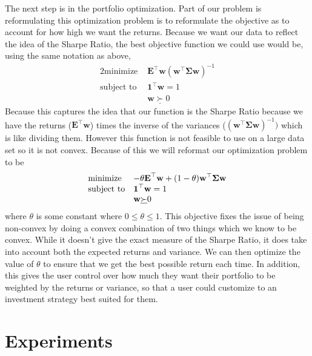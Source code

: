 \documentclass{article}
\begin{document}
The next step is in the portfolio optimization.  Part of our problem is reformulating this optimization problem is to reformulate the objective as to account for how high we want the returns.  Because we want our data to reflect the idea of the Sharpe Ratio, the best objective function we could use would be, using the same notation as above,
\begin{alignat*}{2}
    \text{minimize }   &   \textbf{E}^\top \textbf{w} (\textbf{w}^\top \mathbf{\Sigma} \textbf{w})^{-1}\\
    \text{subject to } 
    & \textbf{1}^\top \textbf{w} = 1 \\
    & \textbf{w} \underline{\succ} 0
\end{alignat*}
Because this captures the idea that our function is the Sharpe Ratio because we have the returns ($\textbf{E}^\top \textbf{w}$) times the inverse of the variances ($(\textbf{w}^\top \mathbf{\Sigma} \textbf{w})^{-1})$ which is like dividing them.  However this function is not feasible to use on a large data set so it is not convex.  Because of this we will reformat our optimization problem to be
\begin{equation}
\begin{array}{ll@{}ll}
\text{minimize}  & \displaystyle -\theta \textbf{E}^\top \textbf{w} + (1-\theta)\textbf{w}^\top \mathbf{\Sigma} \textbf{w} &\\
\text{subject to}& \displaystyle\textbf{1}^\top \textbf{w} = 1 \\
                 &  \textbf{w} \underline{\succ} 0                                     
\end{array}
\end{equation}
where $\theta$ is some constant where $0 \leq \theta \leq 1$. This objective fixes the issue of being non-convex by doing a convex combination of two things which we know to be convex.  While it doesn't give the exact measure of the Sharpe Ratio, it does take into account both the expected returns and variance.  We can then optimize the value of $\theta$ to ensure that we get the best possible return each time.  In addition, this gives the user control over how much they want their portfolio to be weighted by the returns or variance, so that a user could customize to an investment strategy best suited for them.





\section{Experiments}
\label{exper}
\end{document}
